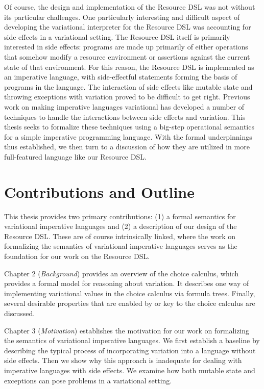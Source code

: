 \documentclass[12pt,oneside]{book}
\begin{document}
Of course, the design and implementation of the Resource DSL was not without its particular challenges. One particularly interesting and difficult aspect of developing
the variational interpreter for the Resource DSL was accounting for side effects in a variational setting. The Resource DSL itself is primarily interested in side effects: programs are
made up primarily of either operations that somehow modify a resource environment or assertions against the current state of that environment. For this reason, the
Resource DSL is implemented as an imperative language, with side-effectful statements forming the basis of programs in the language. The interaction of side effects
like mutable state and throwing exceptions with variation proved to be difficult to get right. Previous work on making imperative languages variational has developed a
number of techniques to handle the interactions between side effects and variation. This thesis seeks to formalize these techniques using a big-step operational
semantics for a simple imperative programming language. With the formal underpinnings thus established, we then turn to a discussion of how they are utilized in more
full-featured language like our Resource DSL.

\section{Contributions and Outline}
\label{sec:contrib}

This thesis provides two primary contributions: (1) a formal semantics for variational imperative languages
and (2) a description of our design of the Resource DSL. These are of course intrinsically linked, where
the work on formalizing the semantics of variational imperative languages serves as the foundation for
our work on the Resource DSL.

Chapter 2 (\emph{Background}) provides an overview of the choice calculus, which provides a formal
model for reasoning about variation. It describes one way of implementing variational values in the
choice calculus via formula trees. Finally, several desirable properties that are enabled by or
key to the choice calculus are discussed.

Chapter 3 (\emph{Motivation}) establishes the motivation for our work on formalizing
the semantics of variational imperative languages. We first establish
a baseline by describing the typical process of incorporating variation into
a language without side effects. Then we show why this approach is inadequate
for dealing with imperative languages with side effects. We examine how both
mutable state and exceptions can pose problems in a variational setting.
\end{document}
